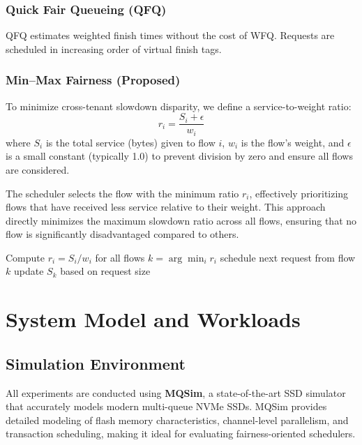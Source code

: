 \documentclass[11pt]{article}
\begin{document}
\subsubsection{Quick Fair Queueing (QFQ)}
QFQ estimates weighted finish times without the cost of WFQ. Requests are scheduled in increasing order of virtual finish tags.

\subsubsection{Min--Max Fairness (Proposed)}
To minimize cross-tenant slowdown disparity, we define a service-to-weight ratio:
\[
r_i = \frac{S_i + \epsilon}{w_i}
\]
where $S_i$ is the total service (bytes) given to flow $i$, $w_i$ is the flow's weight, and $\epsilon$ is a small constant (typically 1.0) to prevent division by zero and ensure all flows are considered.

The scheduler selects the flow with the minimum ratio $r_i$, effectively prioritizing flows that have received less service relative to their weight. This approach directly minimizes the maximum slowdown ratio across all flows, ensuring that no flow is significantly disadvantaged compared to others.

\begin{algorithm}[h]
\caption{Min--Max Fairness Scheduler}
\begin{algorithmic}[1]
\State Compute $r_i = S_i / w_i$ for all flows
\State $k = \arg\min_i r_i$
\State schedule next request from flow $k$
\State update $S_k$ based on request size
\end{algorithmic}
\end{algorithm}

\section{System Model and Workloads}

\subsection{Simulation Environment}

All experiments are conducted using \textbf{MQSim}, a state-of-the-art SSD simulator that accurately models modern multi-queue NVMe SSDs. MQSim provides detailed modeling of flash memory characteristics, channel-level parallelism, and transaction scheduling, making it ideal for evaluating fairness-oriented schedulers.
\end{document}
